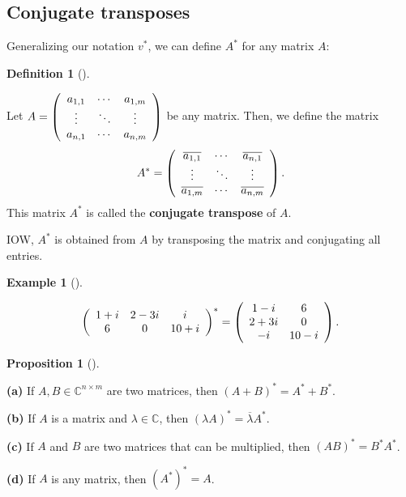 \documentclass[numbers=enddot,12pt,final,onecolumn,notitlepage]{scrartcl}%
\numberwithin{exer}{subsection}
\theoremstyle{definition}
\newtheorem{prop}[theo]{Proposition}
\newenvironment{proposition}[1][]
{\begin{prop}[#1]\begin{leftbar}}
{\end{leftbar}\end{prop}}
\newtheorem{defi}[theo]{Definition}
\newenvironment{definition}[1][]
{\begin{defi}[#1]\begin{leftbar}}
{\end{leftbar}\end{defi}}
\newtheorem{exam}[theo]{Example}
\newenvironment{example}[1][]
{\begin{exam}[#1]\begin{leftbar}}
{\end{leftbar}\end{exam}}
\begin{document}
\subsection{Conjugate transposes}

Generalizing our notation $v^{\ast}$, we can define $A^{\ast}$ for any matrix
$A$:

\begin{definition}
Let $A=\left(
\begin{array}
[c]{ccc}%
a_{1,1} & \cdots & a_{1,m}\\
\vdots & \ddots & \vdots\\
a_{n,1} & \cdots & a_{n,m}%
\end{array}
\right)  $ be any matrix. Then, we define the matrix%
\[
A^{\ast}=\left(
\begin{array}
[c]{ccc}%
\overline{a_{1,1}} & \cdots & \overline{a_{n,1}}\\
\vdots & \ddots & \vdots\\
\overline{a_{1,m}} & \cdots & \overline{a_{n,m}}%
\end{array}
\right)  .
\]
This matrix $A^{\ast}$ is called the \textbf{conjugate transpose} of $A$.
\end{definition}

IOW, $A^{\ast}$ is obtained from $A$ by transposing the matrix and conjugating
all entries.

\begin{example}%
\[
\left(
\begin{array}
[c]{ccc}%
1+i & 2-3i & i\\
6 & 0 & 10+i
\end{array}
\right)  ^{\ast}=\left(
\begin{array}
[c]{cc}%
1-i & 6\\
2+3i & 0\\
-i & 10-i
\end{array}
\right)  .
\]

\end{example}

\begin{proposition}
\textbf{(a)} If $A,B\in\mathbb{C}^{n\times m}$ are two matrices, then $\left(
A+B\right)  ^{\ast}=A^{\ast}+B^{\ast}$.

\textbf{(b)} If $A$ is a matrix and $\lambda\in\mathbb{C}$, then $\left(
\lambda A\right)  ^{\ast}=\overline{\lambda}A^{\ast}$.

\textbf{(c)} If $A$ and $B$ are two matrices that can be multiplied, then
$\left(  AB\right)  ^{\ast}=B^{\ast}A^{\ast}$.

\textbf{(d)} If $A$ is any matrix, then $\left(  A^{\ast}\right)  ^{\ast}=A$.
\end{proposition}
\end{document}
